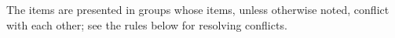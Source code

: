 \documentclass[12pt]{article}
\makeatletter
\newcommand{\TT}[1]{{\tt \bfseries #1}}
\newcommand{\ttmkey}[2]{\TT{#1}\index{#1@{\tt #1}!#2}}
\makeatother
\begin{document}
The items are presented in groups whose items, unless otherwise noted, conflict
with each other; see the rules below for resolving conflicts.

\newcommand{\BEGINGROUP}[2][]{
\begin{tabular}{rllp{4.0in}}
\hspace*{0.1in} & \hspace*{0.1in} & \hspace*{0.4in} \\[-2ex]
& \multicolumn{3}{l}{{\bf #2}\ifstrequal{}{#1}{}{ ~~~~~ #1}} \\
}
\newcommand{\GROUPENTRY}[2][]{
&& \ttmkey{#2}{table format}\ifstrequal{}{#1}{}{#1} & }
\newcommand{\GROUPNEWLINE}{\\&&&}
\newcommand{\ENDGROUP}{\end{tabular}}
\end{document}
